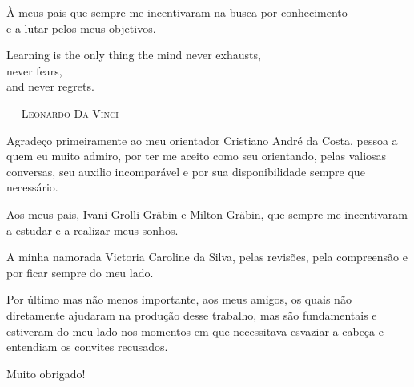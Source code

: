 \documentclass[english,brazilian]{UNISINOSmonografia}
\begin{document}
\capa
\folhaderosto

\begin{dedicatoria}
À meus pais que sempre me incentivaram na busca por conhecimento \\e a lutar pelos meus objetivos.\\[4ex] %

\begin{itshape} %
Learning is the only thing the mind never exhausts, \\
never fears, \\
and never regrets.\\
\end{itshape}
--- \textsc{Leonardo Da Vinci} %
\end{dedicatoria}

\begin{agradecimentos}
Agradeço primeiramente ao meu orientador Cristiano André da Costa, pessoa a quem eu muito admiro, por ter me aceito como seu orientando, pelas valiosas conversas, seu auxilio incomparável e por sua disponibilidade sempre que necessário.

Aos meus pais, Ivani Grolli Gräbin e Milton Gräbin, que sempre me incentivaram a estudar e a realizar meus sonhos.

A minha namorada Victoria Caroline da Silva, pelas revisões, pela compreensão e por ficar sempre do meu lado.

Por último mas não menos importante, aos meus amigos, os quais não diretamente ajudaram na produção desse trabalho, mas são fundamentais e estiveram do meu lado nos momentos em que necessitava esvaziar a cabeça e entendiam os convites recusados.

Muito obrigado!

\end{agradecimentos}

%
\end{document}

